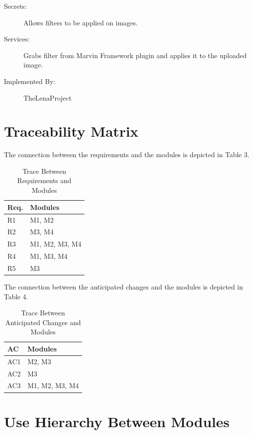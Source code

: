 \documentclass[12pt, titlepage]{article}
\begin{document}
\begin{description}
	\item[Secrets:] Allows filters to be applied on images.
	\item[Services:] Grabs filter from Marvin Framework plugin and applies it to the uploaded image.
	\item[Implemented By:] TheLenaProject
\end{description}

\section{Traceability Matrix} \label{SecTM}

The connection between the requirements and the modules is depicted in Table 3.

\begin{table}[H]
\centering
\begin{tabular}{p{} p{}}
\toprule
\textbf{Req.} & \textbf{Modules}\\
\midrule
R1 & M1, M2 \\
R2 & M3, M4 \\
R3 & M1, M2, M3, M4 \\
R4 & M1, M3, M4 \\
R5 & M3 \\
\bottomrule
\end{tabular}
\caption{Trace Between Requirements and Modules}
\label{TblRT}
\end{table}

The connection between the anticipated changes and the modules is depicted in
Table 4.

\begin{table}[H]
\centering
\begin{tabular}{p{} p{}}
\toprule
\textbf{AC} & \textbf{Modules}\\
\midrule
AC1 & M2, M3\\
AC2 & M3\\
AC3 & M1, M2, M3, M4\\

\bottomrule
\end{tabular}
\caption{Trace Between Anticipated Changes and Modules}
\label{TblACT}
\end{table}

\section{Use Hierarchy Between Modules} \label{SecUse}
\end{document}
